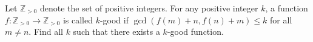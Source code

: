 Let 
$\mathbb{Z}_{>0}$
 denote the set of positive integers. For any positive integer 
$k$, 
 a function 
$f: \mathbb{Z}_{>0} \to \mathbb{Z}_{>0}$
 is called 
$k$-good
 if 
$\gcd(f(m) + n, f(n) + m) \le k$
 for all 
$m \neq n$.
 Find all 
$k$
 such that there exists a 
$k$-good function.
